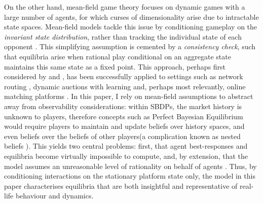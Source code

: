 On the other hand, mean-field game theory focuses on dynamic games with a large number of agents, for which curses of dimensionality arise due to intractable state spaces. 
Mean-field models tackle this issue by conditioning gameplay on the \textit{invariant state distribution}, rather than tracking the individual state of each opponent \citep{light2022mean}.
This simplifying assumption is cemented by a \textit{consistency check}, such that equilibria arise when rational play conditional on an aggregate state maintains this same state as a fixed point. 
This approach, perhaps first considered by \cite{jovanovic1988anonymous} and \cite{hopenhayn1992entry}, has been successfully applied to settings such as network routing \citep{calderone2017markov}, dynamic auctions with learning \citep{iyer2014mean} and, perhaps most relevantly, online matching platforms \citep{kanoria2021facilitating,immorlica2021designing}.
In this paper, I rely on mean-field assumptions to abstract away from observability considerations: within SBDPs, the market history is unknown to players, therefore concepts such as Perfect Bayesian Equilibrium would require players to maintain and update beliefs over history spaces, and even beliefs over the beliefs of other players(a complication known as nested beliefs \citep{brandenburger1993hierarchies}).
This yields two central problems: first, that agent best-responses and equilibria become virtually impossible to compute, and, by extension, that the model assumes an unreasonable level of rationality on behalf of agents \citep{iyer2014mean}.
Thus, by conditioning interactions on the stationary platform state only, the model in this paper characterises equilibria that are both insightful and representative of real-life behaviour and dynamics. 

